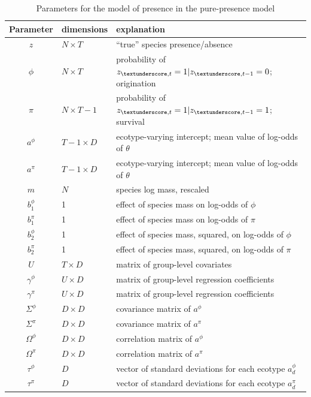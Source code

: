 \begin{table}
  \centering
  \caption{Parameters for the model of presence in the pure-presence model}
  \begin{tabular}{c l l}
    Parameter & dimensions & explanation \\
    \hline
    \(z\) & \(N \times T\) & ``true'' species presence/absence \\
    \(\phi\) & \(N \times T\) & probability of \(z_{\textunderscore, t} = 1 | z_{\textunderscore, t - 1} = 0 \); origination \\
    \(\pi\) & \(N \times T - 1\) & probability of \(z_{\textunderscore, t} = 1 | z_{\textunderscore, t - 1} = 1 \); survival \\
    \(a^{\phi}\) & \(T - 1 \times D\) & ecotype-varying intercept; mean value of log-odds of \(\theta\) \\
    \(a^{\pi}\) & \(T - 1 \times D\) & ecotype-varying intercept; mean value of log-odds of \(\theta\) \\
    \(m\) & \(N\) & species log mass, rescaled \\
    \(b^{\phi}_{1}\) & 1 & effect of species mass on log-odds of \(\phi\) \\
    \(b^{\pi}_{1}\) & 1 & effect of species mass on log-odds of \(\pi\) \\
    \(b^{\phi}_{2}\) & 1 & effect of species mass, squared, on log-odds of \(\phi\) \\
    \(b^{\pi}_{2}\) & 1 & effect of species mass, squared, on log-odds of \(\pi\) \\
    \(U\) & \(T \times D\) & matrix of group-level covariates \\
    \(\gamma^{\phi}\) & \(U \times D\) & matrix of group-level regression coefficients \\
    \(\gamma^{\pi}\) & \(U \times D\) & matrix of group-level regression coefficients \\
    \(\Sigma^{\phi}\) & \(D \times D\) & covariance matrix of \(a^{\phi}\) \\
    \(\Sigma^{\pi}\) & \(D \times D\) & covariance matrix of \(a^{\pi}\) \\
    \(\Omega^{\phi}\) & \(D \times D\) & correlation matrix of \(a^{\phi}\) \\
    \(\Omega^{\pi}\) & \(D \times D\) & correlation matrix of \(a^{\pi}\) \\
    \(\tau^{\phi}\) & \(D\) & vector of standard deviations for each ecotype \(a^{\phi}_{d}\) \\
    \(\tau^{\pi}\) & \(D\) & vector of standard deviations for each ecotype \(a^{\pi}_{d}\) \\
  \end{tabular}
  \label{tab:bd_param}
\end{table}

